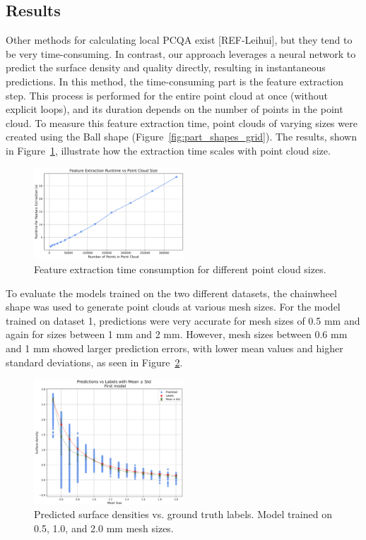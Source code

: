 \subsection{Results}

Other methods for calculating local PCQA exist [REF-Leihui], but they tend to be very time-consuming. In contrast, our approach leverages a neural network to predict the surface density and quality directly, resulting in instantaneous predictions. In this method, the time-consuming part is the feature extraction step. This process is performed for the entire point cloud at once (without explicit loops), and its duration depends on the number of points in the point cloud. To measure this feature extraction time, point clouds of varying sizes were created using the Ball shape (Figure~\ref{fig:part_shapes_grid}). The results, shown in Figure~\ref{fig:time}, illustrate how the extraction time scales with point cloud size.

\begin{figure}[htbp]
\centering
\includegraphics[width=0.5\textwidth]{figures/time_lowQ.png}
\caption{Feature extraction time consumption for different point cloud sizes.}
\label{fig:time}
\end{figure}

To evaluate the models trained on the two different datasets, the chainwheel shape was used to generate point clouds at various mesh sizes. For the model trained on dataset 1, predictions were very accurate for mesh sizes of 0.5 mm and again for sizes between 1 mm and 2 mm. However, mesh sizes between 0.6 mm and 1 mm showed larger prediction errors, with lower mean values and higher standard deviations, as seen in Figure~\ref{fig:pred_vs_label_first}.

\begin{figure}[H]
\centering
\includegraphics[width=0.5\textwidth]{figures/predict_vs_label_first_lowQ.png}
\caption{Predicted surface densities vs. ground truth labels. Model trained on 0.5, 1.0, and 2.0 mm mesh sizes.}
\label{fig:pred_vs_label_first}
\end{figure}

